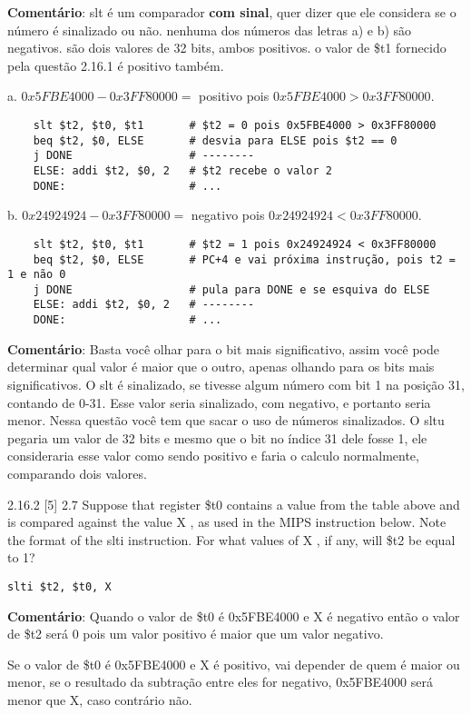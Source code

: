 \documentclass{article}
\begin{document}
\textbf{Comentário}: slt é um comparador \textbf{com sinal}, quer dizer que ele
considera se o número é sinalizado ou não. nenhuma dos números das letras a) e
b) são negativos. são dois valores de 32 bits, ambos positivos. o valor de \$t1
fornecido pela questão 2.16.1 é positivo também.

a. $0x5FBE4000 - 0x3FF80000 =$ positivo pois $0x5FBE4000 > 0x3FF80000$.

  \begin{verbatim}
    slt $t2, $t0, $t1       # $t2 = 0 pois 0x5FBE4000 > 0x3FF80000
    beq $t2, $0, ELSE       # desvia para ELSE pois $t2 == 0
    j DONE                  # --------
    ELSE: addi $t2, $0, 2   # $t2 recebe o valor 2
    DONE:                   # ...
  \end{verbatim}

b. $0x24924924 - 0x3FF80000 =$ negativo pois $0x24924924 < 0x3FF80000$.

  \begin{verbatim}
    slt $t2, $t0, $t1       # $t2 = 1 pois 0x24924924 < 0x3FF80000
    beq $t2, $0, ELSE       # PC+4 e vai próxima instrução, pois t2 = 1 e não 0
    j DONE                  # pula para DONE e se esquiva do ELSE
    ELSE: addi $t2, $0, 2   # --------
    DONE:                   # ...
  \end{verbatim}

\textbf{Comentário}: Basta você olhar para o bit mais significativo, assim você
pode determinar qual valor é maior que o outro, apenas olhando para os bits mais
significativos. O slt é sinalizado, se tivesse algum número com bit 1 na posição
31, contando de 0-31. Esse valor seria sinalizado, com negativo, e  portanto
seria menor. Nessa questão você tem que sacar o uso de números sinalizados. O
sltu pegaria um valor de 32 bits e mesmo que o bit no índice 31 dele fosse 1,
ele consideraria esse valor como sendo positivo e faria o calculo normalmente,
comparando dois valores.

2.16.2  [5] 2.7 Suppose that register \$t0 contains a value from the table
above and is compared against the value X , as used in the MIPS instruction
below. Note the format of the slti instruction. For what values of X , if any,
will \$t2 be equal to 1?

\verb|slti $t2, $t0, X|

\textbf{Comentário}: Quando o valor de \$t0 é 0x5FBE4000 e X é negativo então o
valor de \$t2 será 0 pois um valor positivo é maior que um valor negativo.

Se o valor de \$t0 é 0x5FBE4000 e X é positivo, vai depender de quem é maior ou
menor, se o resultado da subtração entre eles for negativo, 0x5FBE4000 será
menor que X, caso contrário não.
\end{document}
